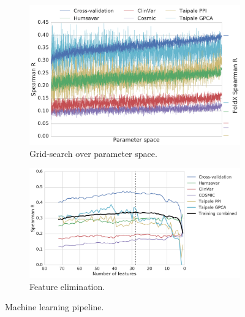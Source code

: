 \begin{figure}[ht]
	\begin{subfigure}[b]{0.6\textwidth}
		\includegraphics[width=1\linewidth]{static/elaspic_training_set/machine_learning/gridsearch_interface.pdf}
		\caption{Grid-search over parameter space.}
		\label{fig:gridsearch_interface}
	\end{subfigure}

	\begin{subfigure}[b]{0.75\textwidth}
		\includegraphics[width=1\linewidth]{static/elaspic_training_set/machine_learning/feature_elimination_interface.pdf}
		\caption{Feature elimination.}
		\label{fig:feature_elimination_interface}
	\end{subfigure}

	\caption{Machine learning pipeline.}
\end{figure}



